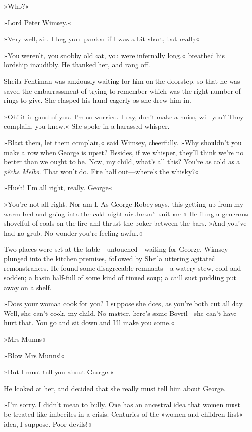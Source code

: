 »Who?«

»Lord Peter Wimsey.«

»Very well, sir. I beg your pardon if I was a bit short, but really\longdash«

»You weren't, you snobby old cat, you were infernally long,« breathed his lordship inaudibly. He thanked her, and rang off.

Sheila Fentiman was anxiously waiting for him on the doorstep, so that he was saved the embarrassment of trying to remember which was the right number of rings to give. She clasped his hand eagerly as she drew him in.

»Oh! it is good of you. I'm so worried. I say, don't make a noise, will you? They complain, you know.« She spoke in a harassed whisper.

»Blast them, let them complain,« said Wimsey, cheerfully. »Why shouldn't you make a row when George is upset? Besides, if we whisper, they'll think we're no better than we ought to be. Now, my child, what's all this? You're as cold as a \textit{pêche Melba}. That won't do. Fire half out—where's the whisky?«

»Hush! I'm all right, really. George\longdash«

»You're not all right. Nor am I. As George Robey says, this getting up from my warm bed and going into the cold night air doesn't suit me.« He flung a generous shovelful of coals on the fire and thrust the poker between the bars. »And you've had no grub. No wonder you're feeling awful.«

Two places were set at the table—untouched—waiting for George. Wimsey plunged into the kitchen premises, followed by Sheila uttering agitated remonstrances. He found some disagreeable remnants—a watery stew, cold and sodden; a basin half-full of some kind of tinned soup; a chill suet pudding put away on a shelf.

»Does your woman cook for you? I suppose she does, as you're both out all day. Well, she can't cook, my child. No matter, here's some Bovril—she can't have hurt that. You go and sit down and I'll make you some.«

»Mrs Munns\longdash«

»Blow Mrs Munns!«

»But I must tell you about George.«

He looked at her, and decided that she really must tell him about George.

»I'm sorry. I didn't mean to bully. One has an ancestral idea that women must be treated like imbeciles in a crisis. Centuries of the »women-and-children-first« idea, I suppose. Poor devils!«

